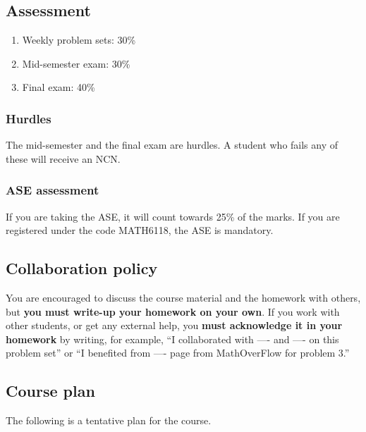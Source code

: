 \documentclass[11pt]{article}
\begin{document}
\subsection{Assessment}
\label{sec:org6bad342}
\begin{enumerate}
\item Weekly problem sets: 30\%
\item Mid-semester exam: 30\%
\item Final exam: 40\%
\end{enumerate}

\subsubsection{Hurdles}
\label{sec:orgd7ecbec}
The mid-semester and the final exam are hurdles.  A student who fails any of these will receive an NCN.

\subsubsection{ASE assessment}
\label{sec:orgeef6fba}
If you are taking the ASE, it will count towards 25\% of the marks.  If you are registered under the code MATH6118, the ASE is mandatory.

\subsection{Collaboration policy}
\label{sec:org833299e}
You are encouraged to discuss the course material and the homework with others, but \textbf{you must write-up your homework on your own}.  If you work with other students, or get any external help, you \textbf{must acknowledge it in your homework} by writing, for example, ``I collaborated with ---- and ---- on this problem set'' or ``I benefited from ---- page from MathOverFlow for problem 3.''

\subsection{Course plan}
\label{sec:org34968f6}
The following is a tentative plan for the course.
\end{document}
